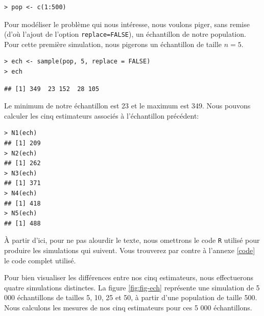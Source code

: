 \documentclass[10pt]{article}
\begin{document}
\begin{verbatim}
> pop <- c(1:500)
\end{verbatim}

Pour modéliser le problème qui nous intéresse, nous voulons piger, sans
remise (d'où l'ajout de l'option \texttt{replace=FALSE}), un échantillon
de notre population. Pour cette première simulation, nous pigerons un
échantillon de taille \(n=5\).

\begin{verbatim}
> ech <- sample(pop, 5, replace = FALSE)
> ech
\end{verbatim}

\begin{verbatim}
## [1] 349  23 152  28 105
\end{verbatim}

Le minimum de notre échantillon est 23 et le maximum est 349. Nous
pouvons calculer les cinq estimateurs associés à l'échantillon
précédent:

\begin{verbatim}
> N1(ech)
## [1] 209
> N2(ech)
## [1] 262
> N3(ech)
## [1] 371
> N4(ech)
## [1] 418
> N5(ech)
## [1] 488
\end{verbatim}

À partir d'ici, pour ne pas alourdir le texte, nous omettrons le code
\texttt{R} utilisé pour produire les simulations qui suivent. Vous
trouverez par contre à l'annexe \ref{code} le code complet utilisé.

Pour bien visualiser les différences entre nos cinq estimateurs, nous
effectuerons quatre simulations distinctes. La figure \ref{fig:fig-ech}
représente une simulation de 5 000 échantillons de tailles 5, 10, 25 et
50, à partir d'une population de taille 500. Nous calculons les mesures
de nos cinq estimateurs pour ces 5 000 échantillons.
\end{document}
